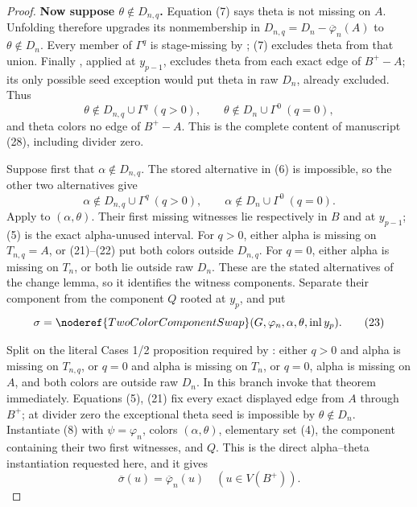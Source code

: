 \begin{proof}
\textbf{Now suppose \(\theta\notin D_{n,q}\).}
Equation (7) says theta is not missing on \(A\).  Unfolding
 therefore upgrades its nonmembership in
\(D_{n,q}=D_n-\overline\varphi_n(A)\) to \(\theta\notin D_n\).
Every member of \(\Gamma^q\) is stage-missing by
; (7) excludes theta from that
union.  Finally
, applied at \(y_{p-1}\),
excludes theta from each exact edge of \(B^+-A\); its only possible seed
exception would put theta in raw \(D_n\), already excluded.  Thus
\[
 \theta\notin D_{n,q}\cup\Gamma^q\ (q>0),\qquad
 \theta\notin D_n\cup\Gamma^0\ (q=0),                        \tag{21}
\]
and theta colors no edge of \(B^+-A\).  This is the complete content of
manuscript (28), including divider zero.

Suppose first that \(\alpha\notin D_{n,q}\).  The stored alternative in
(6) is impossible, so the other two alternatives give
\[
 \alpha\notin D_{n,q}\cup\Gamma^q\ (q>0),\qquad
 \alpha\notin D_n\cup\Gamma^0\ (q=0).                        \tag{22}
\]
Apply  to \((\alpha,\theta)\).  Their first missing
witnesses lie respectively in \(B\) and at \(y_{p-1}\); (5) is the exact
alpha-unused interval.  For \(q>0\), either alpha is missing on
\(T_{n,q}=A\), or (21)--(22) put both colors outside \(D_{n,q}\).  For
\(q=0\), either alpha is missing on \(T_n\), or both lie outside raw
\(D_n\).  These are the stated alternatives of the change lemma, so it
identifies the witness components.  Separate their component from the
component \(Q\) rooted at \(y_p\), and put
\[
 \sigma=\noderef{TwoColorComponentSwap}
       (G,\varphi_n,\alpha,\theta,\operatorname{inl}y_p).      \tag{23}
\]

Split on the literal Cases 1/2 proposition required by
: either \(q>0\) and alpha is missing on
\(T_{n,q}\), or \(q=0\) and alpha is missing on \(T_n\), or \(q=0\),
alpha is missing on \(A\), and both colors are outside raw \(D_n\).
In this branch invoke that theorem immediately.  Equations (5), (21)
fix every exact displayed edge from \(A\) through \(B^+\); at divider
zero the exceptional theta seed is impossible by \(\theta\notin D_n\).
Instantiate (8) with \(\psi=\varphi_n\), colors
\((\alpha,\theta)\), elementary set (4), the component containing their
two first witnesses, and \(Q\).  This is the direct alpha--theta
instantiation requested here, and it gives
\[
 \overline\sigma(u)=\overline\varphi_n(u)
                           \quad(u\in V(B^+)).                 \tag{24}
\]


\end{proof}
